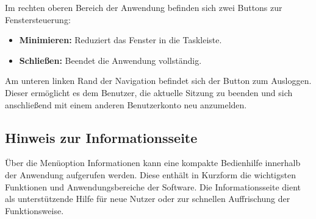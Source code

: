 

Im rechten oberen Bereich der Anwendung befinden sich zwei Buttons zur Fenstersteuerung:

\begin{itemize}
    \item \textbf{Minimieren:} Reduziert das Fenster in die Taskleiste.
    \item \textbf{Schließen:} Beendet die Anwendung vollständig.
\end{itemize}

Am unteren linken Rand der Navigation befindet sich der Button zum Ausloggen. Dieser ermöglicht es dem Benutzer, die aktuelle Sitzung zu beenden und sich anschließend mit einem anderen Benutzerkonto neu anzumelden.

\subsection*{Hinweis zur Informationsseite}

Über die Menüoption \glqq Informationen\grqq{} kann eine kompakte Bedienhilfe innerhalb der Anwendung aufgerufen werden. Diese enthält in Kurzform die wichtigsten Funktionen und Anwendungsbereiche der Software. Die Informationsseite dient als unterstützende Hilfe für neue Nutzer oder zur schnellen Auffrischung der Funktionsweise.
